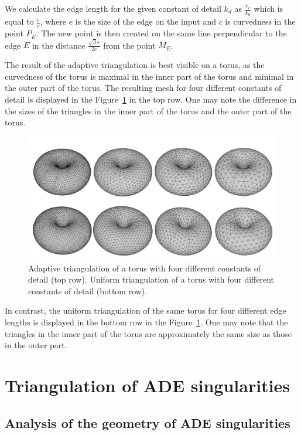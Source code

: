 We calculate the edge length for the given constant of detail $k_d$ as $\frac{r_c}{k_d}$
which is equal to $\frac{e}{c}$, where $e$ is the size of the edge on the input 
and $c$ is curvedness in the point $P_E$. The new point is then created on the same
line perpendicular to the edge $E$ in the distance $\frac{\sqrt{3}e}{2c}$ from the point
$M_E$.

The result of the adaptive triangulation is best visible on a torus, as the curvedness
of the torus is maximal in the inner part of the torus and minimal in the outer part of the torus.
The resulting mesh for four different constants of detail is displayed in the
Figure~\ref{img:58} in the top row. One may note the difference in the sizes of the 
triangles in the inner
part of the torus and the outer part of the torus.

\begin{figure}[h!]
    \centerline{\includegraphics[scale=0.5]{images/img58}}
    \caption[Adaptive triangulation of a torus]
    {Adaptive triangulation of a torus with four different constants of detail (top row).
    Uniform triangulation of a torus with four different constants of detail (bottom row).}
    \label{img:58}
\end{figure}

In contrast, the uniform triangulation of the same torus for four different edge lengths
is displayed in the bottom row in the Figure~\ref{img:58}. One may note that the 
triangles in the inner part of the torus are approximately the same 
size as those in the outer part.

\section{Triangulation of ADE singularities}
\label{sub3.2}

\subsection{Analysis of the geometry of ADE singularities}

